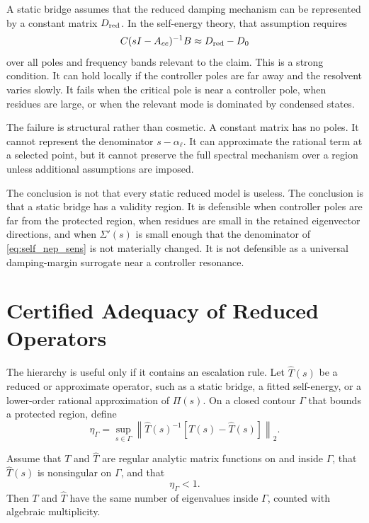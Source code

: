 A static bridge assumes that the reduced damping mechanism can be represented
by a constant matrix \(D_{\rm red}\). In the self-energy theory, that assumption
requires
\begin{equation}
  C(sI-A_{cc})^{-1}B\approx D_{\rm red}-D_0
  \label{eq:self_static_approx}
\end{equation}
over all poles and frequency bands relevant to the claim. This is a strong
condition. It can hold locally if the controller poles are far away and the
resolvent varies slowly. It fails when the critical pole is near a controller
pole, when residues are large, or when the relevant mode is dominated by
condensed states.

The failure is structural rather than cosmetic. A constant matrix has no poles.
It cannot represent the denominator \(s-\alpha_\ell\). It can approximate the
rational term at a selected point, but it cannot preserve the full spectral
mechanism over a region unless additional assumptions are imposed.

\begin{remark}
The conclusion is not that every static reduced model is useless. The
conclusion is that a static bridge has a validity region. It is defensible
when controller poles are far from the protected region, when residues are
small in the retained eigenvector directions, and when \(\Sigma'(s)\) is small
enough that the denominator of \eqref{eq:self_nep_sens} is not materially
changed. It is not defensible as a universal damping-margin surrogate near a
controller resonance.
\end{remark}

\section{Certified Adequacy of Reduced Operators}

The hierarchy is useful only if it contains an escalation rule. Let
\(\widehat T(s)\) be a reduced or approximate operator, such as a static bridge,
a fitted self-energy, or a lower-order rational approximation of \(\Pi(s)\).
On a closed contour \(\Gamma\) that bounds a protected region, define
\begin{equation}
  \eta_\Gamma
  =
  \sup_{s\in\Gamma}
  \left\|
  \widehat T(s)^{-1}\left[T(s)-\widehat T(s)\right]
  \right\|_2 .
  \label{eq:self_eta_gamma}
\end{equation}

\begin{theorem}
\label{thm:self_contour_adequacy}
Assume that \(T\) and \(\widehat T\) are regular analytic matrix functions on
and inside \(\Gamma\), that \(\widehat T(s)\) is nonsingular on \(\Gamma\), and
that
\begin{equation}
  \eta_\Gamma<1 .
  \label{eq:self_eta_condition}
\end{equation}
Then \(T\) and \(\widehat T\) have the same number of eigenvalues inside
\(\Gamma\), counted with algebraic multiplicity.
\end{theorem}

